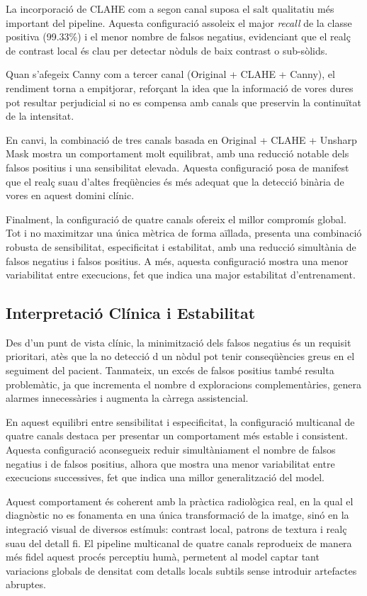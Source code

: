 \documentclass[12pt,a4paper]{article}
\begin{document}
La incorporació de CLAHE com a segon canal suposa el salt qualitatiu més important del
pipeline. Aquesta configuració assoleix el major \textit{recall} de la classe positiva
(99.33\%) i el menor nombre de falsos negatius, evidenciant que el realç de contrast
local és clau per detectar nòduls de baix contrast o sub-sòlids.

Quan s’afegeix Canny com a tercer canal (Original + CLAHE + Canny), el rendiment torna a
empitjorar, reforçant la idea que la informació de vores dures pot resultar perjudicial
si no es compensa amb canals que preservin la continuïtat de la intensitat.

En canvi, la combinació de tres canals basada en Original + CLAHE + Unsharp Mask mostra
un comportament molt equilibrat, amb una reducció notable dels falsos positius i una
sensibilitat elevada. Aquesta configuració posa de manifest que el realç suau d’altes
freqüències és més adequat que la detecció binària de vores en aquest domini clínic.

Finalment, la configuració de quatre canals ofereix el millor compromís global. Tot i no
maximitzar una única mètrica de forma aïllada, presenta una combinació robusta de
sensibilitat, especificitat i estabilitat, amb una reducció simultània de falsos negatius
i falsos positius. A més, aquesta configuració mostra una menor variabilitat entre
execucions, fet que indica una major estabilitat d’entrenament.


\subsection{Interpretació Clínica i Estabilitat}

Des d’un punt de vista clínic, la minimització dels falsos negatius és un requisit
prioritari, atès que la no detecció d un nòdul pot tenir conseqüències greus en el
seguiment del pacient. Tanmateix, un excés de falsos positius també resulta problemàtic,
ja que incrementa el nombre d exploracions complementàries, genera alarmes innecessàries
i augmenta la càrrega assistencial.

En aquest equilibri entre sensibilitat i especificitat, la configuració multicanal de
quatre canals destaca per presentar un comportament més estable i consistent. Aquesta
configuració aconsegueix reduir simultàniament el nombre de falsos negatius i de falsos
positius, alhora que mostra una menor variabilitat entre execucions successives, fet que
indica una millor generalització del model.

Aquest comportament és coherent amb la pràctica radiològica real, en la qual el diagnòstic
no es fonamenta en una única transformació de la imatge, sinó en la integració visual de
diversos estímuls: contrast local, patrons de textura i realç suau del detall fi. El
pipeline multicanal de quatre canals reprodueix de manera més fidel aquest procés
perceptiu humà, permetent al model captar tant variacions globals de densitat com detalls
locals subtils sense introduir artefactes abruptes.
\end{document}
